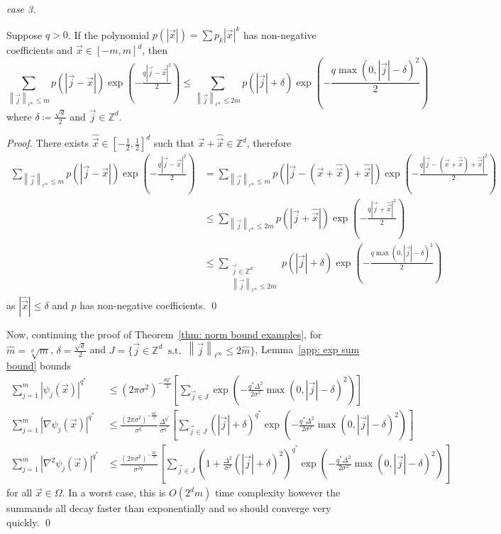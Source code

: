 \documentclass[smallextended]{svjour3}
\let\F\mathds\let\C\mathcal\newcommand{\R}{\F{R}}\newcommand{\A}{\tens{A}}
\newcommand{\norm}[1]{{\left\lVert #1 \right\rVert}}
\newcommand{\1}{\F{1}}
\DeclareMathOperator{\st}{\;s.t.\;}
\renewcommand{\hat}{\widehat}\renewcommand{\tilde}{\widetilde}
\newcommand{\Domain}{\Omega}\newcommand{\domain}{\omega}
\begin{document}
\begin{proof}[case 3]
		\begin{lemma}\label{app: exp sum bound}
			Suppose $q>0$. If the polynomial $p(|\vec{x}|) = \sum p_k|\vec{x}|^k$ has non-negative coefficients and $\vec{x}\in[-m,m]^d$, then
			$$\sum_{\norm{\vec{j}}_{\ell^\infty}\leq m} p(|\vec{j}-\vec{x}|)\exp\left(-\tfrac{q|\vec{j}-\vec{x}|^2}{2}\right)\leq \sum_{\norm{\vec{j}}_{\ell^\infty}\leq2m}p(|\vec{j}|+\delta)\exp\left(-\frac{q\max(0,|\vec{j}|-\delta)^2}{2}\right)$$
			where $\delta\coloneqq \frac{\sqrt{d}}{2}$ and $\vec{j}\in\F Z^d$.
		\end{lemma}
		\begin{proof}
			There exists $\hat{\vec{x}}\in[-\tfrac12,\tfrac12]^d$ such that $\vec{x} + \hat{\vec{x}}\in\F Z^d$, therefore
			\begin{align*}
				\sum_{\norm{\vec{j}}_{\ell^\infty}\leq m} p(|\vec{j}-\vec{x}|)\exp\left(-\tfrac{q|\vec{j}-\vec{x}|^2}{2}\right) &= \sum_{\norm{\vec{j}}_{\ell^\infty}\leq m} p(|\vec{j}-(\vec{x}+\hat{\vec{x}})+\hat{\vec{x}}|)\exp\left(-\tfrac{q|\vec{j}-(\vec{x}+\hat{\vec{x}})+\hat{\vec{x}}|^2}{2}\right)
				\\&\leq \sum_{\norm{\vec{j}}_{\ell^\infty}\leq2m} p(|\vec{j}+\hat{\vec{x}}|)\exp\left(-\tfrac{q|\vec{j}+\hat{\vec{x}}|^2}{2}\right)
				\\&\leq \sum_{\substack{\vec{j}\in\F Z^d\\\norm{\vec{j}}_{\ell^\infty}\leq2m}} p(|\vec{j}|+\delta)\exp\left(-\tfrac{q\max(0,|\vec{j}|-\delta)^2}{2}\right)
			\end{align*}
			as $|\hat{\vec{x}}|\leq \delta$ and $p$ has non-negative coefficients. 
			\qed\end{proof}
		
		Now, continuing the proof of Theorem~\ref{thm: norm bound examples}, for $\hat m=\sqrt[d]{m}$, $\delta=\frac{\sqrt{d}}{2}$ and $J=\{\vec{j}\in\F Z^d \st \norm{\vec{j}}_{\ell^\infty}\leq 2\hat m\}$, Lemma~\ref{app: exp sum bound} bounds 
		\begin{align*}
			\sum_{j=1}^m |\psi_j(\vec{x})|^{q^*} &\leq (2\pi\sigma^2)^{-\frac{dq^*}{2}} \left[\sum_{\vec{j}\in J} \exp\left(-\frac{q^*\Delta^2}{2\sigma^2}\max(0,|\vec{j}|-\delta)^2\right)\right]
			\\\sum_{j=1}^m |\nabla\psi_j(\vec{x})|^{q^*} &\leq \frac{(2\pi\sigma^2)^{-\frac{dq^*}{2}}}{\sigma^{q^*}}\frac{\Delta^{q^*}}{\sigma^{q^*}} \left[\sum_{\vec{j}\in J} (|\vec{j}|+\delta)^{q^*}\exp\left(-\frac{q^*\Delta^2}{2\sigma^2}\max(0,|\vec{j}|-\delta)^2\right)\right]
			\\\sum_{j=1}^m |\nabla^2\psi_j(\vec{x})|^{q^*} &\leq \frac{(2\pi\sigma^2)^{-\frac{dq^*}{2}}}{\sigma^{2q^*}} \left[\sum_{\vec{j}\in J} \left(1+\frac{\Delta^2}{\sigma^2}(|\vec{j}|+\delta)^2\right)^{q^*}\exp\left(-\frac{q^*\Delta^2}{2\sigma^2}\max(0,|\vec{j}|-\delta)^2\right)\right]
		\end{align*}
		for all $\vec{x}\in\Domain$. In a worst case, this is $O(2^dm)$ time complexity however the summands all decay faster than exponentially and so should converge very quickly.	
		\qed\end{proof}
	
	
\end{document}
